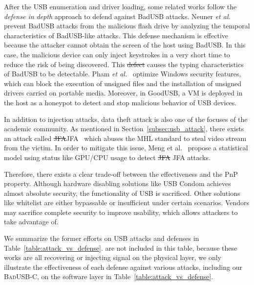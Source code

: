 \documentclass[conference]{IEEEtran}
\newcommand{\tool}{\mbox{\textsc{BadUSB-C}}\xspace}
\providecommand{\DIFaddtex}[1]{{\protect\color{blue}\uwave{#1}}} %
\providecommand{\DIFdeltex}[1]{{\protect\color{red}\sout{#1}}}                      %
\providecommand{\DIFaddbegin}{} %
\providecommand{\DIFaddend}{} %
\providecommand{\DIFdelbegin}{} %
\providecommand{\DIFdelend}{} %
\providecommand{\DIFadd}[1]{\texorpdfstring{\DIFaddtex{#1}}{#1}} %
\providecommand{\DIFdel}[1]{\texorpdfstring{\DIFdeltex{#1}}{}} %
\newcommand{\DIFscaledelfig}{0.5}
\newlength{\DIFdelgraphicswidth} %
\newlength{\DIFdelgraphicsheight} %
\newcommand{\DIFaddincludegraphics}[2][]{{\color{blue}\fbox{\DIFOincludegraphics[#1]{#2}}}} %
\newcommand{\DIFdelincludegraphics}[2][]{%
\sbox{\DIFdelgraphicsbox}{\DIFOincludegraphics[#1]{#2}}%
\settoboxwidth{\DIFdelgraphicswidth}{\DIFdelgraphicsbox} %
\settoboxtotalheight{\DIFdelgraphicsheight}{\DIFdelgraphicsbox} %
\scalebox{\DIFscaledelfig}{%
\parbox[b]{\DIFdelgraphicswidth}{\usebox{\DIFdelgraphicsbox}\\[-\baselineskip] \rule{\DIFdelgraphicswidth}{0em}}\llap{\resizebox{\DIFdelgraphicswidth}{\DIFdelgraphicsheight}{%
\setlength{\unitlength}{\DIFdelgraphicswidth}%
\begin{picture}(1,1)%
\thicklines\linethickness{2pt} %
{\color[rgb]{1,0,0}\put(0,0){\framebox(1,1){}}}%
{\color[rgb]{1,0,0}\put(0,0){\line( 1,1){1}}}%
{\color[rgb]{1,0,0}\put(0,1){\line(1,-1){1}}}%
\end{picture}%
}\hspace*{3pt}}} %
} %
\DeclareRobustCommand{\DIFaddbegin}{\DIFOaddbegin \let\includegraphics\DIFaddincludegraphics} %
\DeclareRobustCommand{\DIFaddend}{\DIFOaddend \let\includegraphics\DIFOincludegraphics} %
\DeclareRobustCommand{\DIFdelbegin}{\DIFOdelbegin \let\includegraphics\DIFdelincludegraphics} %
\DeclareRobustCommand{\DIFdelend}{\DIFOaddend \let\includegraphics\DIFOincludegraphics} %
\begin{document}
After the \ac{USB} enumeration and driver loading, some related works follow the \textit{defense in depth} approach to defend against BadUSB attacks.  
Neuner \emph{et al.}~\cite{neuner2018usblock}
prevent BadUSB attacks from the malicious flash drive by analyzing
the temporal characteristics of BadUSB-like attacks. This defense mechanism is
effective because the attacker cannot obtain the screen of the \DIFaddbegin \DIFadd{victim }\DIFaddend host using
BadUSB. In this case, the malicious device can only inject keystrokes in a very
short time to reduce the risk of being discovered. 
This \DIFdelbegin \DIFdel{defect }\DIFdelend \DIFaddbegin \DIFadd{property }\DIFaddend causes the
typing characteristics of BadUSB to be detectable. Pham \emph{et al.}~\cite{pham2010optimizing} optimize Windows security features, which can
block the execution of unsigned files and the installation of unsigned drivers
carried on portable media. Moreover, in GoodUSB, a VM is deployed in the host as
a honeypot to detect and stop malicious behavior of \ac{USB} devices.

In addition to injection attacks, data theft attack is also one of the focuses
of the academic community. As mentioned in Section~\ref{subsec:usb_attack}, there
exists an attack called \DIFdelbegin \DIFdel{JFA}\DIFdelend \DIFaddbegin \ac{JFA}\DIFaddend ~\cite{JFC} which abuses the \ac{MHL}
standard to steal \DIFaddbegin \DIFadd{the }\DIFaddend video stream from the victim. In order to mitigate this
issue, Meng et al.~\cite{meng2018252} propose a statistical model using status
like GPU/CPU usage to detect \DIFdelbegin \DIFdel{JFA }\DIFdelend \DIFaddbegin \ac{JFA} \DIFaddend attacks.

Therefore, there exists a clear trade-off between the effectiveness and the
\ac{PnP} property. Although hardware disabling solutions like \ac{USB} Condom
achieves almost absolute security, the functionality of \ac{USB} is sacrificed.
Other solutions like whitelist are either bypassable or insufficient
under certain scenarios. Vendors may sacrifice complete security to
improve usability, which allows attackers to take advantage of.

We summarize the former efforts on \ac{USB} attacks and defenses in
Table~\ref{table:attack_vs_defense}. \cite{usbkiller, cable,smartphone, poweremi,revealing,su2017usb, usbgpslocator, bates2014leveraging, badusbhub, usbfinger, side, usbdriver, usbee, turnip} are not included in this table, because these works are all recovering or injecting signal on the physical layer, we only illustrate the effectiveness of 
each defense against various attacks, including our \tool, on the software layer in Table~\ref{table:attack_vs_defense}. 
\end{document}
